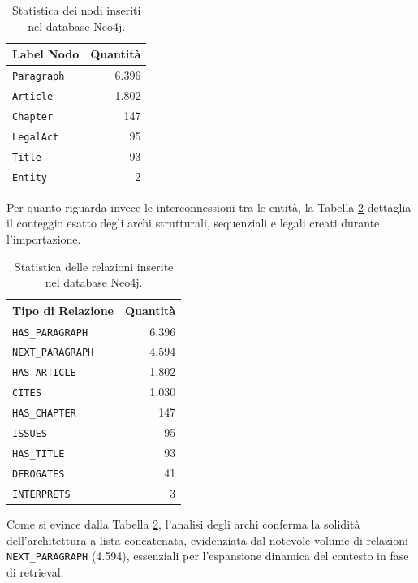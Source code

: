 \begin{table}[H]
    \centering
    \renewcommand{\arraystretch}{1.2}
    \begin{tabular}{|l|r|}
        \hline
        \textbf{Label Nodo} & \textbf{Quantità} \\
        \hline
        \texttt{Paragraph} & 6.396 \\
        \texttt{Article} & 1.802 \\
        \texttt{Chapter} & 147 \\
        \texttt{LegalAct} & 95 \\
        \texttt{Title} & 93 \\
        \texttt{Entity} & 2 \\
        \hline
    \end{tabular}
    \caption{Statistica dei nodi inseriti nel database Neo4j.}
    \label{tab:statistiche_nodi}
\end{table}

Per quanto riguarda invece le interconnessioni tra le entità, la Tabella \ref{tab:statistiche_relazioni} dettaglia il conteggio esatto degli archi strutturali, sequenziali e legali creati durante l'importazione.

\begin{table}[H]
    \centering
    \renewcommand{\arraystretch}{1.2}
    \begin{tabular}{|l|r|}
        \hline
        \textbf{Tipo di Relazione} & \textbf{Quantità} \\
        \hline
        \texttt{HAS\_PARAGRAPH} & 6.396 \\
        \texttt{NEXT\_PARAGRAPH} & 4.594 \\
        \texttt{HAS\_ARTICLE} & 1.802 \\
        \texttt{CITES} & 1.030 \\
        \texttt{HAS\_CHAPTER} & 147 \\
        \texttt{ISSUES} & 95 \\
        \texttt{HAS\_TITLE} & 93 \\
        \texttt{DEROGATES} & 41 \\
        \texttt{INTERPRETS} & 3 \\
        \hline
    \end{tabular}
    \caption{Statistica delle relazioni inserite nel database Neo4j.}
    \label{tab:statistiche_relazioni}
\end{table}

Come si evince dalla Tabella \ref{tab:statistiche_relazioni}, l'analisi degli archi conferma la solidità dell'architettura a lista concatenata, evidenziata dal notevole volume di relazioni \texttt{NEXT\_PARAGRAPH} (4.594), essenziali per l'espansione dinamica del contesto in fase di retrieval. 

